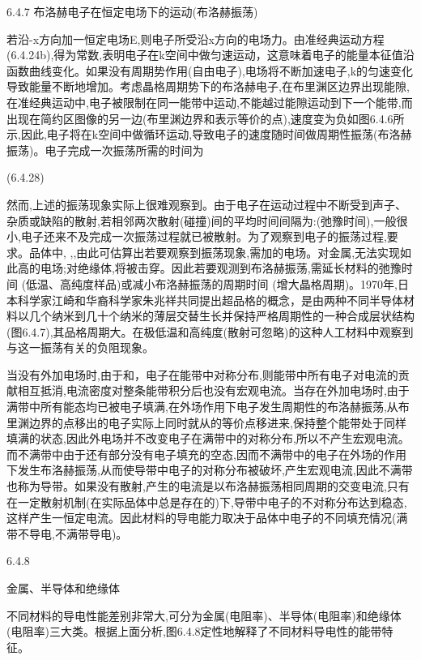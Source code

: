 6.4.7 布洛赫电子在恒定电场下的运动(布洛赫振荡)

若沿-x方向加一恒定电场E,则电子所受沿x方向的电场力。由准经典运动方程(6.4.24b),得为常数,表明电子在k空间中做匀速运动，这意味着电子的能量本征值沿函数曲线变化。如果没有周期势作用(自由电子),电场将不断加速电子,k的匀速变化导致能量不断地增加。考虑晶格周期势下的布洛赫电子,在布里渊区边界出现能隙,在准经典运动中,电子被限制在同一能带中运动,不能越过能隙运动到下一个能带,而出现在简约区图像的另一边(布里渊边界和表示等价的点),速度变为负如图6.4.6所示,因此,电子将在k空间中做循环运动,导致电子的速度随时间做周期性振荡(布洛赫振荡)。电子完成一次振荡所需的时间为

 	(6.4.28)



然而,上述的振荡现象实际上很难观察到。由于电子在运动过程中不断受到声子、杂质或缺陷的散射,若相邻两次散射(碰撞)间的平均时间间隔为:(弛豫时间),一般很小,电子还来不及完成一次振荡过程就已被散射。为了观察到电子的振荡过程,要求。品体中, ,,由此可估算出若要观察到振荡现象,需加的电场。对金属,无法实现如此高的电场;对绝缘体,将被击穿。因此若要观测到布洛赫振荡,需延长材料的弛豫时间 (低温、高纯度样品)或减小布洛赫振荡的周期时间 (增大晶格周期)。1970年,日本科学家江崎和华裔科学家朱兆祥共同提出超品格的概念，是由两种不同半导体材料以几个纳米到几十个纳米的薄层交替生长并保持严格周期性的一种合成层状结构(图6.4.7),其品格周期大。在极低温和高纯度(散射可忽略)的这种人工材料中观察到与这一振荡有关的负阻现象。

当没有外加电场时,由于和，电子在能带中对称分布,则能带中所有电子对电流的贡献相互抵消,电流密度对整条能带积分后也没有宏观电流。当存在外加电场时,由于满带中所有能态均已被电子填满,在外场作用下电子发生周期性的布洛赫振荡,从布里渊边界的点移出的电子实际上同时就从的等价点移进来,保持整个能带处于同样填满的状态,因此外电场并不改变电子在满带中的对称分布,所以不产生宏观电流。而不满带中由于还有部分没有电子填充的空态,因而不满带中的电子在外场的作用下发生布洛赫振荡,从而使导带中电子的对称分布被破坏,产生宏观电流,因此不满带也称为导带。如果没有散射,产生的电流是以布洛赫振荡相同周期的交变电流,只有在一定散射机制(在实际品体中总是存在的)下,导带中电子的不对称分布达到稳态,这样产生一恒定电流。因此材料的导电能力取决于品体中电子的不同填充情况(满带不导电,不满带导电)。

6.4.8

金属、半导体和绝缘体

不同材料的导电性能差别非常大,可分为金属(电阻率)、半导体(电阻率)和绝缘体(电阻率)三大类。根据上面分析,图6.4.8定性地解释了不同材料导电性的能带特征。



